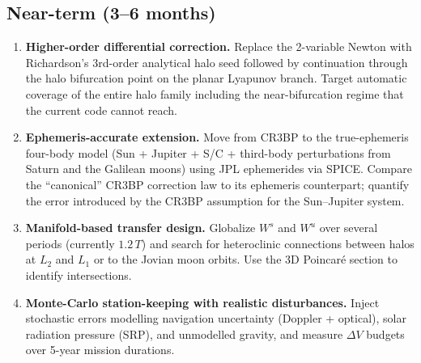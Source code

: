 \documentclass[11pt,a4paper]{article}
\begin{document}
\subsection*{Near-term (3--6 months)}
\begin{enumerate}[leftmargin=*]
  \item \textbf{Higher-order differential correction.}
    Replace the 2-variable Newton with Richardson's 3rd-order analytical halo seed followed by continuation through the halo bifurcation point on the planar Lyapunov branch. Target automatic coverage of the entire halo family including the near-bifurcation regime that the current code cannot reach.
  \item \textbf{Ephemeris-accurate extension.}
    Move from CR3BP to the true-ephemeris four-body model (Sun + Jupiter + S/C + third-body perturbations from Saturn and the Galilean moons) using JPL ephemerides via SPICE. Compare the ``canonical'' CR3BP correction law to its ephemeris counterpart; quantify the error introduced by the CR3BP assumption for the Sun--Jupiter system.
  \item \textbf{Manifold-based transfer design.}
    Globalize $W^s$ and $W^u$ over several periods (currently $1.2\,T$) and search for heteroclinic connections between halos at $L_2$ and $L_1$ or to the Jovian moon orbits. Use the 3D Poincaré section to identify intersections.
  \item \textbf{Monte-Carlo station-keeping with realistic disturbances.}
    Inject stochastic errors modelling navigation uncertainty (Doppler + optical), solar radiation pressure (SRP), and unmodelled gravity, and measure $\Delta V$ budgets over 5-year mission durations.
\end{enumerate}
\end{document}
